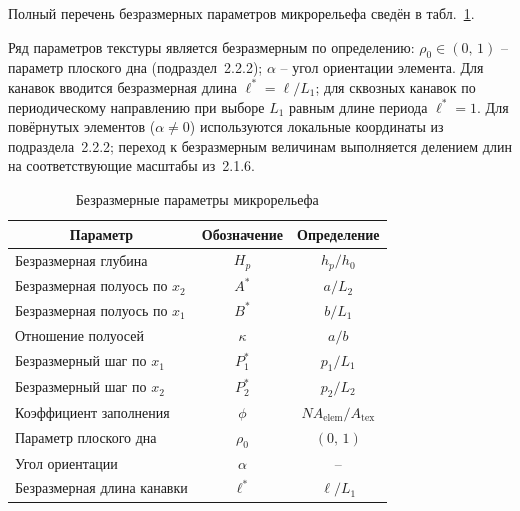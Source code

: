 Полный перечень безразмерных параметров микрорельефа сведён в табл.~\ref{tab:nondim_texture}.

Ряд параметров текстуры является безразмерным по определению:
$\rho_0 \in (0,\,1)$ -- параметр плоского дна (подраздел~2.2.2);
$\alpha$ -- угол ориентации элемента.
Для канавок вводится безразмерная длина $\ell^{*} = \ell / L_1$;
для сквозных канавок по периодическому направлению при выборе
$L_1$ равным длине периода $\ell^{*} = 1$.
Для повёрнутых элементов ($\alpha \neq 0$) используются локальные
координаты из подраздела~2.2.2; переход к безразмерным величинам
выполняется делением длин на соответствующие масштабы из~2.1.6.

\begin{table}[!ht]
\centering
\caption{Безразмерные параметры микрорельефа}
\label{tab:nondim_texture}
\begin{tabularx}{\textwidth}{|X|c|c|}
\hline
\multicolumn{1}{|c|}{\textbf{Параметр}} & \textbf{Обозначение} & \textbf{Определение} \\
\hline
Безразмерная глубина             & $H_p$    & $h_p / h_0$                          \\
\hline
Безразмерная полуось по $x_2$    & $A^{*}$  & $a / L_2$                            \\
\hline
Безразмерная полуось по $x_1$    & $B^{*}$  & $b / L_1$                            \\
\hline
Отношение полуосей               & $\kappa$ & $a / b$                              \\
\hline
Безразмерный шаг по $x_1$        & $P_1^{*}$ & $p_1 / L_1$                        \\
\hline
Безразмерный шаг по $x_2$        & $P_2^{*}$ & $p_2 / L_2$                        \\
\hline
Коэффициент заполнения           & $\phi$   & $N A_{\mathrm{elem}} / A_{\mathrm{tex}}$ \\
\hline
Параметр плоского дна            & $\rho_0$ & $(0,\,1)$                            \\
\hline
Угол ориентации                  & $\alpha$ & --                                   \\
\hline
Безразмерная длина канавки       & $\ell^{*}$ & $\ell / L_1$                       \\
\hline
\end{tabularx}
\end{table}

\FloatBarrier

